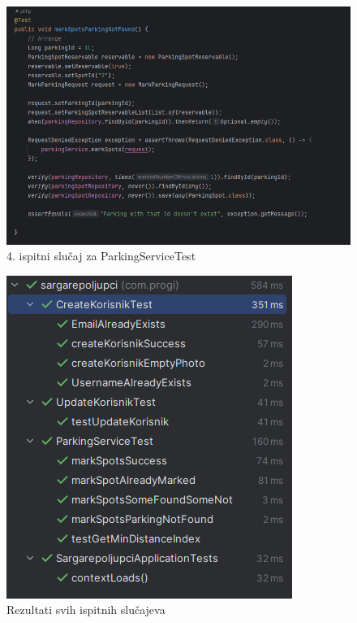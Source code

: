 \begin{figure}[H]
	\includegraphics[width=\textwidth]{slike/markspotparking.png} %
	\centering
	\caption{4. ispitni slučaj za ParkingServiceTest}
	\label{fig:dijagramstanja}
\end{figure}


\begin{figure}[H]
	\includegraphics[width=\textwidth]{slike/results.png} %
	\centering
	\caption{Rezultati svih ispitnih slučajeva}
	\label{fig:dijagramstanja}
\end{figure}

